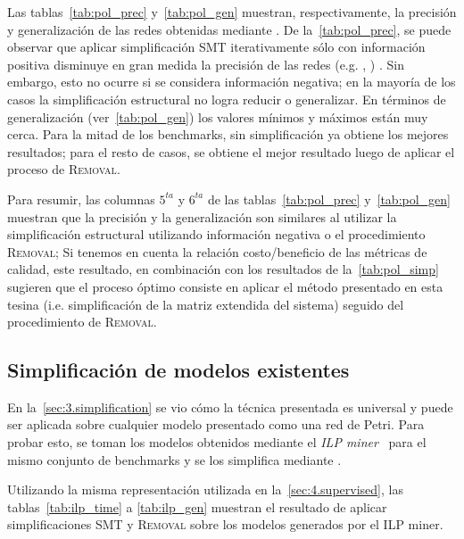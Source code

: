 Las tablas~\ref{tab:pol_prec} y~\ref{tab:pol_gen} muestran, respectivamente, la precisión y generalización de las redes
obtenidas mediante \pachtool. De la~\autoref{tab:pol_prec}, se puede observar que 
aplicar simplificación SMT iterativamente sólo con información positiva disminuye en gran medida la precisión de las
redes (e.g. , ) . Sin embargo, esto no ocurre si se considera 
información negativa; en la mayoría de los casos la simplificación estructural no logra reducir o generalizar.
En términos de generalización (ver~\autoref{tab:pol_gen}) los valores mínimos y máximos están muy 
cerca. Para la mitad de los benchmarks, \pachtool sin simplificación ya obtiene los mejores resultados;
para el resto de casos, se obtiene el mejor resultado luego de aplicar el proceso de \textsc{Removal}.



Para resumir, las columnas $5^{ta}$ y $6^{ta}$ de las tablas~\ref{tab:pol_prec} y~\ref{tab:pol_gen} muestran que 
la precisión y la generalización son similares al utilizar la simplificación estructural utilizando información 
negativa o el procedimiento \textsc{Removal}; 
Si tenemos en cuenta la relación costo/beneficio de las métricas de calidad, este resultado,
en combinación con los resultados de la~\autoref{tab:pol_simp}
sugieren que el proceso óptimo consiste en aplicar el método presentado en esta tesina (i.e. simplificación de la matriz 
extendida del sistema) seguido del procedimiento de \textsc{Removal}.



\subsection{Simplificación de modelos existentes}
\label{sec:4.simp_existing}

En la~\autoref{sec:3.simplification} se vio cómo la técnica presentada es universal y puede ser aplicada sobre
cualquier modelo presentado como una red de Petri. Para probar esto, se toman los modelos obtenidos
mediante el \textit{ILP miner}~\cite{WDHS08} para el mismo conjunto de benchmarks y se los simplifica mediante
\pachtool.

Utilizando la misma representación utilizada en la~\autoref{sec:4.supervised}, las tablas~\ref{tab:ilp_time} a
\ref{tab:ilp_gen} muestran el resultado de aplicar simplificaciones SMT y \textsc{Removal} sobre los
modelos generados por el ILP miner.

